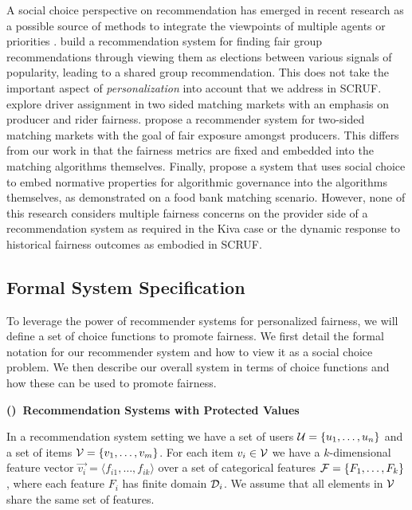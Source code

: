 A social choice perspective on recommendation has emerged in recent research as a possible source of methods to integrate the viewpoints of multiple agents or priorities \cite{burke2020algorithmic}. \cite{chakraborty2019equality} build a recommendation system for finding fair group recommendations through viewing them as elections between various signals of popularity, leading to a shared group recommendation.  This does not take the important aspect of \emph{personalization} into account that we address in SCRUF.  \cite{suhr2019two} explore driver assignment in two sided matching markets with an emphasis on producer and rider fairness. \cite{patro2020fairrec} propose a recommender system for two-sided matching markets with the goal of fair exposure amongst producers.  This differs from our work in that the fairness metrics are fixed and embedded into the matching algorithms themselves.  Finally, \cite{lee2019webuildai} propose a system that uses social choice to embed normative properties for algorithmic governance into the algorithms themselves, as demonstrated on a food bank matching scenario. However, none of this research considers multiple fairness concerns on the provider side of a recommendation system as required in the Kiva case or the dynamic response to historical fairness outcomes as embodied in SCRUF.


\subsection{Formal System Specification}
To leverage the power of recommender systems for personalized fairness, we will define a set of choice functions to promote fairness. We first detail the formal notation for our recommender system and how to view it as a social choice problem. We then describe our overall system in terms of choice functions and how these can be used to promote fairness.

\vspace{0.25cm}
\noindent \textbf{()~Recommendation Systems with Protected Values}
\vspace{0.25cm}

In a recommendation system setting we have a set of users $\mathcal{U} = \{u_1, \ldots, u_n\}$ and a set of items $\mathcal{V} = \{v_1, \ldots, v_m\}$. For each item $v_i \in \mathcal{V}$ we have a $k$-dimensional feature vector $\vec{v_i} = \langle f_{i1}, \ldots, f_{ik} \rangle$ over a set of categorical features $\mathcal{F} = \{F_1, \ldots, F_k\}$, where each feature $F_i$ has finite domain $\mathcal{D}_i$. We assume that all elements in $\mathcal{V}$ share the same set of features. 

